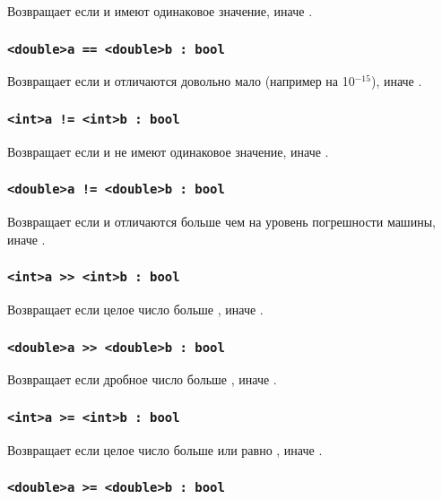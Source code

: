 \documentclass[a4paper, 14pt]{extarticle}
\begin{document}
Возвращает \true{} если  и  имеют одинаковое значение, иначе \false{}.

\subsubsection{\lstinline`<double>a == <double>b : bool`}

Возвращает \true{} если  и  отличаются довольно мало (например на 10$^{-15}$), иначе \false{}.

\subsubsection{\lstinline`<int>a != <int>b : bool`}

Возвращает \true{} если  и  не имеют одинаковое значение, иначе \false{}.

\subsubsection{\lstinline`<double>a != <double>b : bool`}

Возвращает \true{} если  и  отличаются больше чем на уровень погрешности машины, иначе \false{}.

\subsubsection{\lstinline`<int>a >> <int>b : bool`}

Возвращает \true{} если целое число  больше , иначе \false{}.

\subsubsection{\lstinline`<double>a >> <double>b : bool`}

Возвращает \true{} если дробное число  больше , иначе \false{}.

\subsubsection{\lstinline`<int>a >= <int>b : bool`}

Возвращает \true{} если целое число  больше или равно , иначе \false{}.

\subsubsection{\lstinline`<double>a >= <double>b : bool`}
\end{document}
